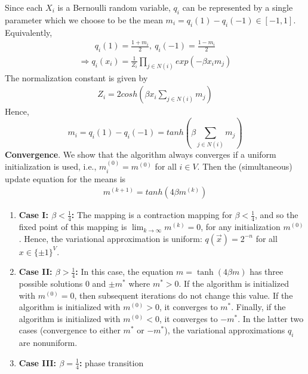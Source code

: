 \documentclass[11pt,a4paper]{article}
\begin{document}
Since each $X_i$ is a Bernoulli random variable, $q_i$ can be represented by a single parameter which we choose to be the mean $m_i = q_i(1) - q_i(-1) \in [-1, 1]$. Equivalently,
\begin{equation}
    \begin{aligned}
        q_i(1)=\frac{1+m_i}{2},\ q_i(-1)=\frac{1-m_i}{2}
    \end{aligned}
    \nonumber
\end{equation}
\begin{equation}
    \begin{aligned}
        \Rightarrow q_i(x_i)=\frac{1}{Z_i}\prod_{j\in N(i)}exp\left(-\beta x_i m_j\right)
    \end{aligned}
    \nonumber
\end{equation}
The normalization constant is given by
\begin{equation}
    \begin{aligned}
        Z_i=2{cosh}\left(\beta x_i\sum_{j\in N(i)}m_j\right)
    \end{aligned}
    \nonumber
\end{equation}
Hence, $$m_i=q_i(1)-q_i(-1)={tanh}\left(\beta\sum_{j\in N(i)}m_j\right)$$
\textbf{Convergence}. We show that the algorithm always converges if a uniform initialization is used, i.e., $m_i^{(0)} = m^{(0)}$ for all $i \in V$. Then the (simultaneous) update equation for the means is
\begin{equation}
    \begin{aligned}
        m^{(k+1)}={tanh}\left(4\beta m^{(k)}\right)
    \end{aligned}
    \nonumber
\end{equation}
\begin{enumerate}[(1)]
    \item \textbf{Case I: $\beta < \frac{1}{4}$:} The mapping is a contraction mapping for $\beta<\frac{1}{4}$, and so the fixed point of this mapping is $\lim_{k \rightarrow \infty} m^{(k)} = 0$, for any initialization $m^{(0)}$. Hence, the variational approximation is uniform: $q(\vec{x}) = 2^{-n}$ for all $x \in \{\pm 1\}^V$.
    \item \textbf{Case II: $\beta > \frac{1}{4}$:} In this case, the equation $m=\tanh (4 \beta m)$ has three possible solutions 0 and $\pm m^*$ where $m^*>0$. If the algorithm is initialized with $m^{(0)}=0$, then subsequent iterations do not change this value. If the algorithm is initialized with $m^{(0)}>0$, it converges to $m^*$. Finally, if the algorithm is initialized with $m^{(0)}<0$, it converges to $-m^*$. In the latter two cases (convergence to either $m^*$ or $-m^*$), the variational approximations $q_i$ are nonuniform.
    \item \textbf{Case III: $\beta = \frac{1}{4}$:} phase transition
\end{enumerate}
\end{document}
